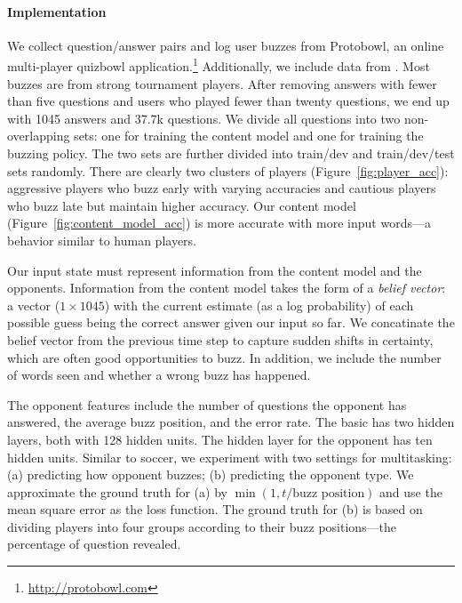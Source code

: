 \paragraph{Implementation}

We collect question/answer pairs and log user buzzes from Protobowl, an online
multi-player quizbowl application.\footnote{\url{http://protobowl.com}}
Additionally, we include data from
\citet{Boyd-Graber:Satinoff:He:Daume-III-2012}.
Most buzzes are from strong tournament players.
After removing answers with
fewer than five questions and users who played fewer than twenty questions, we end up with
1045 answers and 37.7k questions.  We divide all questions into two
non-overlapping sets: one for training the content model and one for training
the buzzing policy.
The two sets are further divided into train/dev and train/dev/test sets randomly.
There are clearly two clusters of players
(Figure~\ref{fig:player_acc}): aggressive players who buzz early with varying
accuracies and cautious players who buzz late but maintain higher accuracy.
Our \gru{} content model (Figure~\ref{fig:content_model_acc}) is more accurate
with more input words---a behavior similar to human players.

Our input state must represent information from the content model and the
opponents.  Information from the content model takes the form of a \emph{belief
  vector}: a vector ($1\times 1045$) with the current estimate (as a log probability) of
each possible guess being the correct answer given our
input so far. We concatinate the belief vector from the previous time
step to capture sudden shifts in certainty, which are
often good opportunities to buzz.
In addition, we include the number of words seen and whether a wrong buzz has happened.

The opponent features include the number of questions the opponent has answered,
the average buzz position, and the error rate.  The basic \dqn{} has two hidden
layers, both with 128 hidden units.  The hidden layer for the opponent has ten
hidden units.  Similar to soccer, we experiment with two settings for
multitasking: (a) predicting how opponent buzzes; (b)
predicting the opponent type.  We approximate the ground truth for
(a) by $\min(1, t/\mbox{buzz position})$ and use the mean square error as the
loss function.  The ground truth for (b) is based on dividing players into four
groups according to their buzz positions---the percentage of question
revealed.

